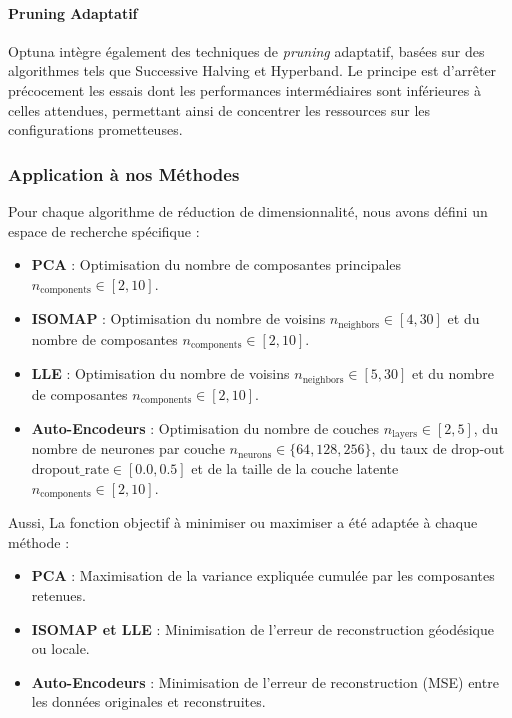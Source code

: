 \documentclass[unnumsec,webpdf,modern,large]{projet_manifold}%
\theoremstyle{thmstyleone}%
\theoremstyle{thmstyletwo}%
\theoremstyle{thmstylethree}%
\begin{document}
\paragraph{Pruning Adaptatif}

Optuna intègre également des techniques de \textit{pruning} adaptatif, basées sur des algorithmes tels que Successive Halving et Hyperband. Le principe est d'arrêter précocement les essais dont les performances intermédiaires sont inférieures à celles attendues, permettant ainsi de concentrer les ressources sur les configurations prometteuses.

\subsubsection{Application à nos Méthodes}

Pour chaque algorithme de réduction de dimensionnalité, nous avons défini un espace de recherche spécifique :

\begin{itemize} 
    \item \textbf{PCA} : Optimisation du nombre de composantes principales $n_{\text{components}} \in [2, 10]$. 
    \item \textbf{ISOMAP} : Optimisation du nombre de voisins $n_{\text{neighbors}} \in [4, 30]$ et du nombre de composantes $n_{\text{components}} \in [2, 10]$. 
    \item \textbf{LLE} : Optimisation du nombre de voisins $n_{\text{neighbors}} \in [5, 30]$ et du nombre de composantes $n_{\text{components}} \in [2, 10]$. 
    \item \textbf{Auto-Encodeurs} : Optimisation du nombre de couches $n_{\text{layers}} \in [2, 5]$, du nombre de neurones par couche $n_{\text{neurons}} \in \{64, 128, 256\}$, du taux de drop-out $\text{dropout\_rate} \in [0.0, 0.5]$ et de la taille de la couche latente $n_{\text{components}} \in [2, 10]$. 
\end{itemize}



Aussi, La fonction objectif à minimiser ou maximiser a été adaptée à chaque méthode :

\begin{itemize} \item \textbf{PCA} : Maximisation de la variance expliquée cumulée par les composantes retenues. \item \textbf{ISOMAP et LLE} : Minimisation de l'erreur de reconstruction géodésique ou locale. \item \textbf{Auto-Encodeurs} : Minimisation de l'erreur de reconstruction (MSE) entre les données originales et reconstruites. \end{itemize}
\end{document}
